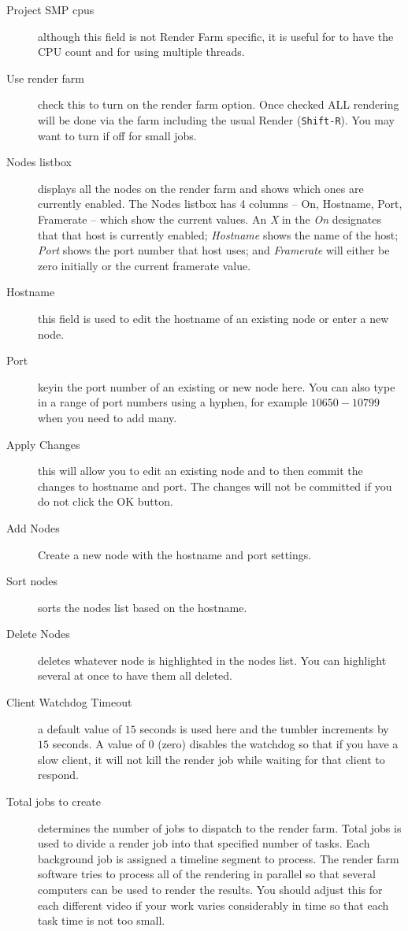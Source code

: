 \begin{description}
\item[Project SMP cpus] although this field is not Render Farm
  specific, it is useful for \CGG{} to have the CPU count and for
  using multiple threads.
\item[Use render farm] check this to turn on the render farm option.
  Once checked ALL rendering will be done via the farm including the
  usual Render (\texttt{Shift-R}).  You may want to turn if off for
  small jobs.
\item[Nodes listbox] displays all the nodes on the render farm and
  shows which ones are currently enabled. The Nodes listbox has 4
  columns -- On, Hostname, Port, Framerate -- which show the current
  values.  An \textit{X} in the \textit{On} designates that that host
  is currently enabled; \textit{Hostname} shows the name of the host;
  \textit{Port} shows the port number that host uses; and
  \textit{Framerate} will either be zero initially or the current
  framerate value.
\item[Hostname] this field is used to edit the hostname of an
  existing node or enter a new node.
\item[Port] keyin the port number of an existing or new node here.
  You can also type in a range of port numbers using a hyphen, for
  example $10650-10799$ when you need to add many.
\item[Apply Changes] this will allow you to edit an existing node
  and to then commit the changes to hostname and port. The changes
  will not be committed if you do not click the OK button.
\item[Add Nodes] Create a new node with the hostname and port
  settings.
\item[Sort nodes] sorts the nodes list based on the hostname.
\item[Delete Nodes] deletes whatever node is highlighted in the
  nodes list.  You can highlight several at once to have them all
  deleted.
\item[Client Watchdog Timeout] a default value of $15$ seconds is
  used here and the tumbler increments by $15$ seconds.  A value of
  $0$ (zero) disables the watchdog so that if you have a slow client,
  it will not kill the render job while waiting for that client to
  respond.
\item[Total jobs to create] determines the number of jobs to
  dispatch to the render farm.  Total jobs is used to divide a render
  job into that specified number of tasks.  Each background job is
  assigned a timeline segment to process.  The render farm software
  tries to process all of the rendering in parallel so that several
  computers can be used to render the results.  You should adjust
  this for each different video if your work varies considerably in
  time so that each task time is not too small.


\end{description}
